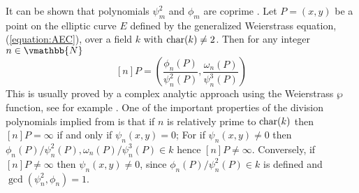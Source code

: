It can be shown that polynomials $\psi_m^2$ and $\phi_m$ are coprime \cite[Sec. 1.3]{Schmitt2003}. 
Let $P = (x, y)$ be a point on the elliptic curve $E$ defined by the generalized Weierstrass 
equation, (\ref{equation:AEC}), over a field $k$ with $\operatorname{char}(k) \ne 2$. Then for any integer $n 
\in \vmathbb{N}$
\begin{equation}
\label{equation:mult-by-n}
[n]P = \left( \frac{\phi_n(P)}{\psi_n^2(P)}, \frac{\omega_n(P)}{\psi_n^3(P)}\right)
\end{equation}
This is usually proved by a complex analytic approach using the Weierstrass $\wp$ function, see for 
example \cite{Lang1978}. One of the important properties of the division polynomials implied from 
 is that if $n$ is relatively prime to $\operatorname{char}(k)$ then $[n]P = 
\infty$ if and only if $\psi_n(x, y) = 0$; For if $\psi_n(x, y) \ne 0$ then $\phi_n(P) / 
\psi_n^2(P), \omega_n(P) / \psi_n^3(P) \in k$ hence $[n]P \ne \infty$. Conversely, if $[n]P \ne 
\infty$ then $\psi_n(x, y) \ne 0$, since $\phi_n(P) / \psi_n^2(P) \in k$ is defined and 
$\gcd(\psi_n^2, \phi_n) = 1$.

